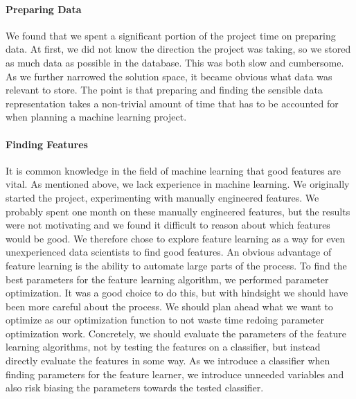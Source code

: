 \paragraph{Preparing Data}
We found that we spent a significant portion of the project time on preparing data. At first, we did not know the direction the project was taking, so we stored as much data as possible in the database. This was both slow and cumbersome. As we further narrowed the solution space, it became obvious what data was relevant to store. The point is that preparing and finding the sensible data representation takes a non-trivial amount of time that has to be accounted for when planning a machine learning project.

\paragraph{Finding Features}
It is common knowledge in the field of machine learning that good features are vital. As mentioned above, we lack experience in machine learning. We originally started the project, experimenting with manually engineered features. We probably spent one month on these manually engineered features, but the results were not motivating and we found it difficult to reason about which features would be good. We therefore chose to explore feature learning as a way for even unexperienced data scientists to find good features. An obvious advantage of feature learning is the ability to automate large parts of the process. To find the best parameters for the feature learning algorithm, we performed parameter optimization. It was a good choice to do this, but with hindsight we should have been more careful about the process. We should plan ahead what we want to optimize as our optimization function to not waste time redoing parameter optimization work. Concretely, we should evaluate the parameters of the feature learning algorithms, not by testing the features on a classifier, but instead directly evaluate the features in some way. As we introduce a classifier when finding parameters for the feature learner, we introduce unneeded variables and also risk biasing the parameters towards the tested classifier.

